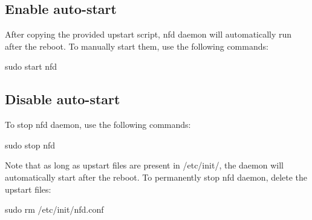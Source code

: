 \subsection*{Enable auto-\/start }

After copying the provided upstart script, {\ttfamily nfd} daemon will automatically run after the reboot. To manually start them, use the following commands\+: \begin{DoxyVerb}sudo start nfd
\end{DoxyVerb}


\subsection*{Disable auto-\/start }

To stop {\ttfamily nfd} daemon, use the following commands\+: \begin{DoxyVerb}sudo stop nfd
\end{DoxyVerb}


Note that as long as upstart files are present in {\ttfamily /etc/init/}, the daemon will automatically start after the reboot. To permanently stop {\ttfamily nfd} daemon, delete the upstart files\+: \begin{DoxyVerb}sudo rm /etc/init/nfd.conf\end{DoxyVerb}
 